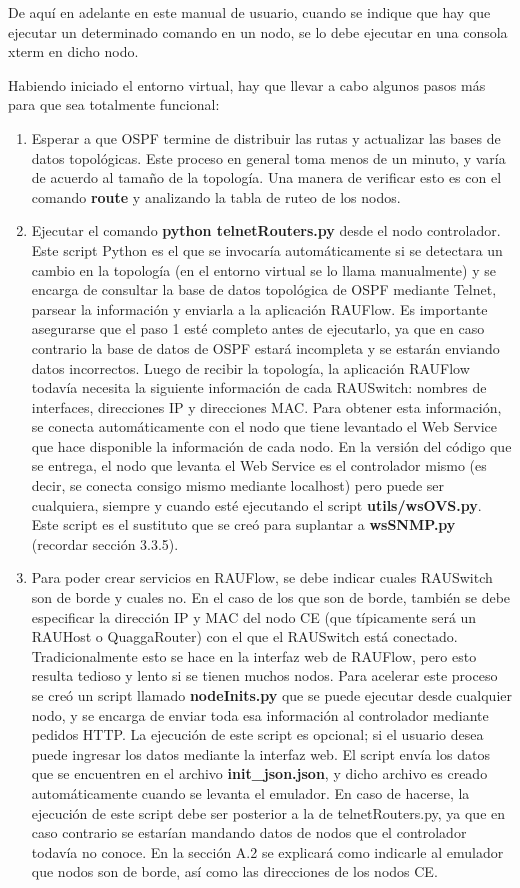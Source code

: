 De aquí en adelante en este manual de usuario, cuando se indique que hay que ejecutar un determinado comando en un nodo, se lo debe ejecutar en una consola xterm en dicho nodo.

Habiendo iniciado el entorno virtual, hay que llevar a cabo algunos pasos más para que sea totalmente funcional:
\begin{enumerate}
	\item Esperar a que OSPF termine de distribuir las rutas y actualizar las bases de datos topológicas. Este proceso en general toma menos de un minuto, y varía de acuerdo al tamaño de la topología. Una manera de verificar esto es con el comando \textbf{route} y analizando la tabla de ruteo de los nodos.
	\item Ejecutar el comando \textbf{python telnetRouters.py} desde el nodo controlador. Este script Python es el que se invocaría automáticamente si se detectara un cambio en la topología (en el entorno virtual se lo llama manualmente) y se encarga de consultar la base de datos topológica de OSPF mediante Telnet, parsear la información y enviarla a la aplicación RAUFlow. Es importante asegurarse que el paso 1 esté completo antes de ejecutarlo, ya que en caso contrario la base de datos de OSPF estará incompleta y se estarán enviando datos incorrectos. Luego de recibir la topología, la aplicación RAUFlow todavía necesita la siguiente información de cada RAUSwitch: nombres de interfaces, direcciones IP y direcciones MAC. Para obtener esta información, se conecta automáticamente con el nodo que tiene levantado el Web Service que hace disponible la información de cada nodo. En la versión del código que se entrega, el nodo que levanta el Web Service es el controlador mismo (es decir, se conecta consigo mismo mediante localhost) pero puede ser cualquiera, siempre y cuando esté ejecutando el script \textbf{utils/wsOVS.py}. Este script es el sustituto que se creó para suplantar a \textbf{wsSNMP.py} (recordar sección 3.3.5).
	\item Para poder crear servicios en RAUFlow, se debe indicar cuales RAUSwitch son de borde y cuales no. En el caso de los que son de borde, también se debe especificar la dirección IP y MAC del nodo CE (que típicamente será un RAUHost o QuaggaRouter) con el que el RAUSwitch está conectado. Tradicionalmente esto se hace en la interfaz web de RAUFlow, pero esto resulta tedioso y lento si se tienen muchos nodos. Para acelerar este proceso se creó un script llamado \textbf{nodeInits.py} que se puede ejecutar desde cualquier nodo, y se encarga de enviar toda esa información al controlador mediante pedidos HTTP. La ejecución de este script es opcional; si el usuario desea puede ingresar los datos mediante la interfaz web. El script envía los datos que se encuentren en el archivo \textbf{init\_json.json}, y dicho archivo es creado automáticamente cuando se levanta el emulador. En caso de hacerse, la ejecución de este script debe ser posterior a la de telnetRouters.py, ya que en caso contrario se estarían mandando datos de nodos que el controlador todavía no conoce. En la sección A.2 se explicará como indicarle al emulador que nodos son de borde, así como las direcciones de los nodos CE.
\end{enumerate}

